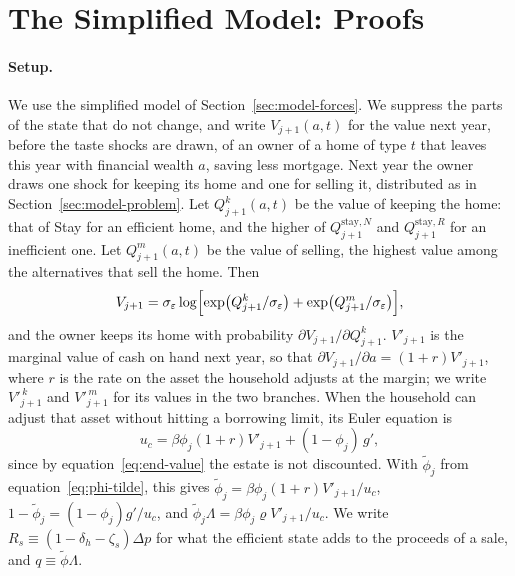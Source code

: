 \section{The Simplified Model: Proofs}\label{app:proofs}

\paragraph{Setup.}
We use the simplified model of Section~\ref{sec:model-forces}. We suppress
the parts of the state that do not change, and write $V_{j+1}(a,t)$ for the
value next year, before the taste shocks are drawn, of an owner of a home
of type $t$ that leaves this year with financial wealth $a$, saving less
mortgage. Next year the owner draws one shock for keeping its home and one
for selling it, distributed as in Section~\ref{sec:model-problem}. Let
$Q^k_{j+1}(a,t)$ be the value of keeping the home: that of Stay for an
efficient home, and the higher of $Q^{\mathrm{stay},N}_{j+1}$ and
$Q^{\mathrm{stay},R}_{j+1}$ for an inefficient one. Let $Q^m_{j+1}(a,t)$ be the value of selling,
the highest value among the alternatives that sell the home. Then
\begin{equation}
  V_{j+1}=\sigma_\varepsilon\log\Bigl[\exp\bigl(Q^k_{j+1}/\sigma_\varepsilon\bigr)
  +\exp\bigl(Q^m_{j+1}/\sigma_\varepsilon\bigr)\Bigr],
  \label{eq:app-logsum}
\end{equation}
and the owner keeps its home with probability
$\partial V_{j+1}/\partial Q^k_{j+1}$. $V'_{j+1}$ is the marginal value of
cash on hand next year, so that $\partial V_{j+1}/\partial a=(1+r)V'_{j+1}$,
where $r$ is the rate on the asset the household adjusts at the margin; we
write $V'^{\,k}_{j+1}$ and $V'^{\,m}_{j+1}$ for its values in the two
branches. When the household can adjust
that asset without hitting a borrowing limit, its Euler equation is
\begin{equation}
  u_c=\beta\phi_j(1+r)V'_{j+1}+(1-\phi_j)\,g',
  \label{eq:app-euler}
\end{equation}
since by equation~\eqref{eq:end-value} the estate is not discounted. With
$\tilde\phi_j$ from equation~\eqref{eq:phi-tilde}, this gives
$\tilde\phi_j=\beta\phi_j(1+r)V'_{j+1}/u_c$,
$1-\tilde\phi_j=(1-\phi_j)g'/u_c$, and
$\tilde\phi_j\Lambda=\beta\phi_j\varrho V'_{j+1}/u_c$. We write $R_s\equiv(1-\delta_h-\zeta_s)\Delta p$ for what the efficient
state adds to the proceeds of a sale, and $q\equiv\tilde\phi\Lambda$.

